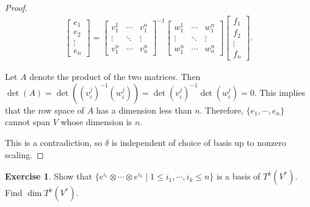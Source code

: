 \documentclass[12pt, psamsfonts]{amsart}
\theoremstyle{definition}
\newtheorem{exer}[thm]{Exercise}
\theoremstyle{remark}
\numberwithin{equation}{section}
\begin{document}
\begin{proof}
  \begin{align*}
    \begin{bmatrix} e_1 \\ e_2 \\ \vdots \\ e_n \end{bmatrix}
      = \begin{bmatrix} v^1_1 & \cdots & v^n_1 \\ \vdots & \ddots & \vdots \\ v^n_1 & \cdots & v^n_n \end{bmatrix}^{-1}
         \begin{bmatrix} w^1_1 & \cdots & w^n_1 \\ \vdots & \ddots & \vdots \\ w^n_1 & \cdots & w^n_n \end{bmatrix}
         \begin{bmatrix} f_1 \\ f_2 \\ \vdots \\ f_n \end{bmatrix}.
  \end{align*}

  Let $A$ denote the product of the two matrices.
  Then $\det(A) = \det((v_i^j)^{-1}(w_i^j)) = \det(v_i^j)^{-1}\det(w_i^j) = 0$.
  This implies that the row space of $A$ has a dimension less than $n$.
  Therefore, $\{ e_1, \cdots, e_n \}$ cannot span $V$ whose dimension is $n$.

  This is a contradiction, so $\delta$ is independent of choice of basis up to nonzero scaling.
\end{proof}

\begin{exer}
  Show that $\{ e^{i_1} \otimes \cdots \otimes e^{i_k} \mid 1 \leq i_1, \cdots, i_k \leq n \}$ is a basis of $T^k(V^*)$.
  Find $\dim T^k(V^*)$.
\end{exer}
\end{document}
